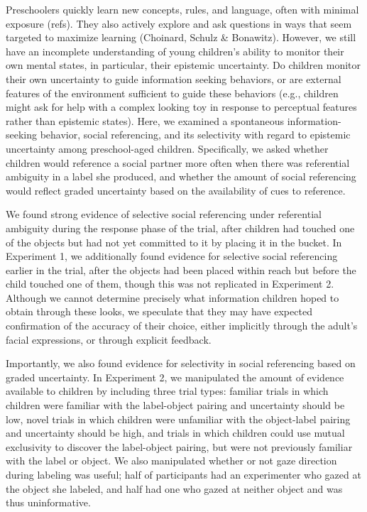 \documentclass[10pt, letterpaper]{article}
\begin{document}
Preschoolers quickly learn new concepts, rules, and language, often with
minimal exposure (refs). They also actively explore and ask questions in
ways that seem targeted to maximize learning (Choinard, Schulz \&
Bonawitz). However, we still have an incomplete understanding of young
children's ability to monitor their own mental states, in particular,
their epistemic uncertainty. Do children monitor their own uncertainty
to guide information seeking behaviors, or are external features of the
environment sufficient to guide these behaviors (e.g., children might
ask for help with a complex looking toy in response to perceptual
features rather than epistemic states). Here, we examined a spontaneous
information-seeking behavior, social referencing, and its selectivity
with regard to epistemic uncertainty among preschool-aged children.
Specifically, we asked whether children would reference a social partner
more often when there was referential ambiguity in a label she produced,
and whether the amount of social referencing would reflect graded
uncertainty based on the availability of cues to reference.

We found strong evidence of selective social referencing under
referential ambiguity during the response phase of the trial, after
children had touched one of the objects but had not yet committed to it
by placing it in the bucket. In Experiment 1, we additionally found
evidence for selective social referencing earlier in the trial, after
the objects had been placed within reach but before the child touched
one of them, though this was not replicated in Experiment 2. Although we
cannot determine precisely what information children hoped to obtain
through these looks, we speculate that they may have expected
confirmation of the accuracy of their choice, either implicitly through
the adult's facial expressions, or through explicit feedback.

Importantly, we also found evidence for selectivity in social
referencing based on graded uncertainty. In Experiment 2, we manipulated
the amount of evidence available to children by including three trial
types: familiar trials in which children were familiar with the
label-object pairing and uncertainty should be low, novel trials in
which children were unfamiliar with the object-label pairing and
uncertainty should be high, and trials in which children could use
mutual exclusivity to discover the label-object pairing, but were not
previously familiar with the label or object. We also manipulated
whether or not gaze direction during labeling was useful; half of
participants had an experimenter who gazed at the object she labeled,
and half had one who gazed at neither object and was thus uninformative.
\end{document}

